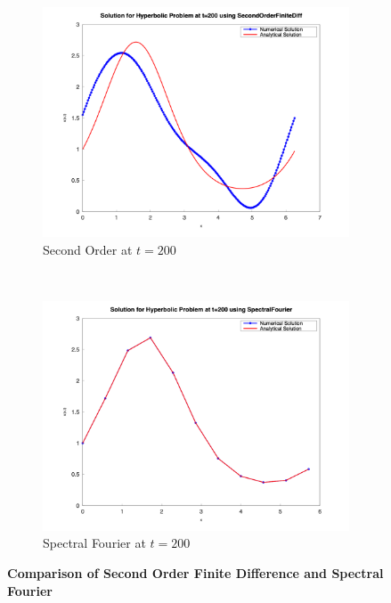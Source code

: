 \begin{figure}[H]
\begin{subfigure}{0.5\textwidth}
		\includegraphics[width=\textwidth]{media/hyperbolic_SecondOrderFiniteDiff_200.png}
		\caption{Second Order at $t=200$}
		\label{sfig:sublabel5}
	\end{subfigure}%
	~
	\begin{subfigure}{0.5\textwidth}
		\includegraphics[width=\textwidth]{media/hyperbolic_SpectralFourier_200.png}
		\caption{Spectral Fourier at $t=200$}
		\label{sfig:sublabel6}
	\end{subfigure}

	\caption{\textbf{Comparison of Second Order Finite Difference and Spectral Fourier}
	}
	\label{fig:figureLabel}
\end{figure}
